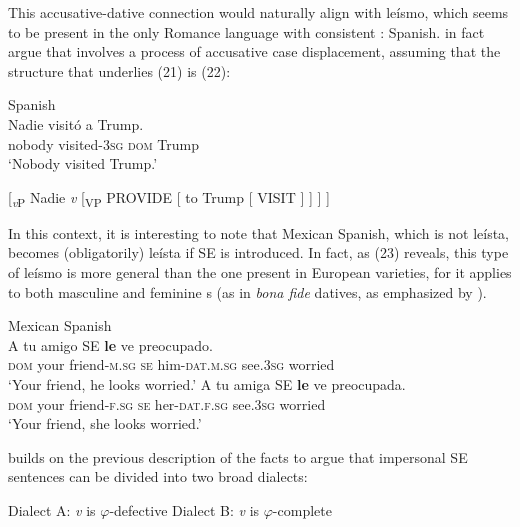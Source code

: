 \documentclass[output=paper]{langsci/langscibook}
\begin{document}
This accusative-dative connection would naturally align with leísmo, which seems to be present in the only Romance language with consistent \DOM: Spanish. \citet{ColominaEtAl2017} in fact argue that \DOM involves a process of accusative case displacement, assuming that the structure that underlies (21) is (22):

\ea%
    Spanish\label{ex:gallego:21}\\
    \gll Nadie    visitó             a          Trump.   \\
         nobody  visited\textsc{{}-3}\textsc{sg  dom}   Trump\\
    \glt ‘Nobody visited Trump.’
    \z

\ea%
    \label{ex:gallego:22}
    [\textit{\textsubscript{v}}\textsubscript{P} Nadie \textit{v} [\textsubscript{VP} PROVIDE [ to Trump [ VISIT ] ] ] ]
\z

          

In this context, it is interesting to note that Mexican Spanish, which is not leísta, becomes (obligatorily) leísta if SE is introduced. In fact, as (23) reveals, this type of leísmo is more general than the one present in European varieties, for it applies to both masculine and feminine {\CATDP}s (as in \textit{bona fide} datives, as emphasized by \citealt{ColominaEtAl2017}).

\ea%
    Mexican Spanish\label{ex:gallego:23}\\
    \ea
    \gll A       tu      amigo         SE  \textbf{le} ve         preocupado.  \\
         \textsc{dom}   your friend\textsc{{}-m.}\textsc{sg} \textsc{se}   him\textsc{{}-dat.m.}\textsc{sg}  see\textsc{.3sg} worried\\
    \glt ‘Your friend, he looks worried.’
    \ex
    \gll A       tu      amiga        SE  \textbf{le} ve          preocupada. \\
         \textsc{dom}   your friend\textsc{{}-f.}\textsc{sg} \textsc{se}   her\textsc{{}-dat.f.}\textsc{sg} see\textsc{.3sg} worried\\
    \glt ‘Your friend, she looks worried.’
    \z
\z

\citet{Gallego2016} builds on the previous description of the facts to argue that impersonal SE sentences can be divided into two broad dialects:

\ea%
    \label{ex:gallego:24}
    \ea Dialect A: \textit{v} is $\varphi ${}-defective
    \ex Dialect B: \textit{v} is $\varphi ${}-complete
    \z
\z
\end{document}
